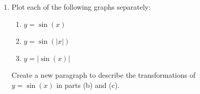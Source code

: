 \begin{enumerate}
    \item Plot each of the following graphs separately:
    \begin{enumerate}
    	\item $y = \sin(x)$
    	\item $y = \sin(|x|)$
    	\item $y = |\sin(x)|$
    \end{enumerate}
    Create a new paragraph to describe the transformations of \\$y = \sin(x)$ in parts (b) and (c).
\end{enumerate}